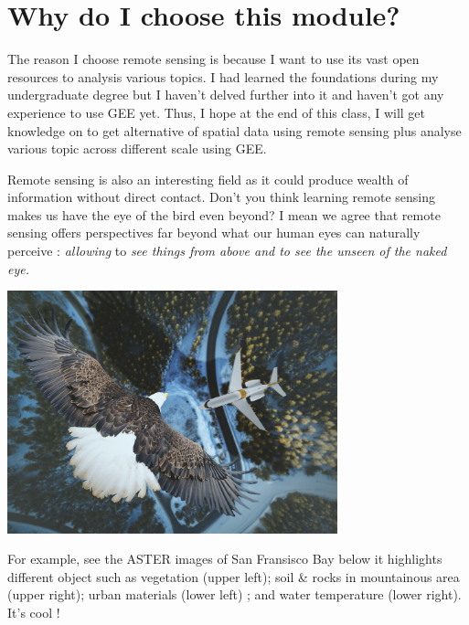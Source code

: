 \documentclass[
  letterpaper,
  DIV=11,
  numbers=noendperiod]{scrreprt}
\begin{document}
\hypertarget{why-do-i-choose-this-module}{%
\section{Why do I choose this
module?}\label{why-do-i-choose-this-module}}

The reason I choose remote sensing is because I want to use its vast
open resources to analysis various topics. I had learned the foundations
during my undergraduate degree but I haven't delved further into it and
haven't got any experience to use GEE yet. Thus, I hope at the end of
this class, I will get knowledge on to get alternative of spatial data
using remote sensing plus analyse various topic across different scale
using GEE.

Remote sensing is also an interesting field as it could produce wealth
of information without direct contact. Don't you think learning remote
sensing makes us have the eye of the bird even beyond? I mean we agree
that remote sensing offers perspectives far beyond what our human eyes
can naturally perceive : \emph{allowing} to \emph{see things from above
and to see the unseen of the naked eye.}

\includegraphics[width=3.76042in,height=\textheight]{images/clipboard-2217286199.png}

For example, see the ASTER images of San Fransisco Bay below it
highlights different object such as vegetation (upper left); soil \&
rocks in mountainous area (upper right); urban materials (lower left) ;
and water temperature (lower right). It's cool !
\end{document}
